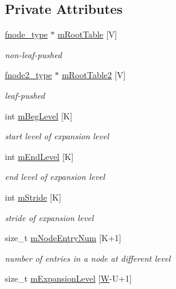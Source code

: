 \subsection*{Private Attributes}
\begin{DoxyCompactItemize}
\item 
\hyperlink{classRFSTree_a82d6848400f7c2700a6283cb34bca3eb}{fnode\-\_\-type} $\ast$ \hyperlink{classRFSTree_a808e44b5d80b37411742e657bd4ba526}{m\-Root\-Table} \mbox{[}V\mbox{]}
\begin{DoxyCompactList}\small\item\em non-\/leaf-\/pushed \end{DoxyCompactList}\item 
\hyperlink{classRFSTree_a0546714395e729135c856124425e97be}{fnode2\-\_\-type} $\ast$ \hyperlink{classRFSTree_a15a1ae729c49a0b6fa355ec4c7428f53}{m\-Root\-Table2} \mbox{[}V\mbox{]}
\begin{DoxyCompactList}\small\item\em leaf-\/pushed \end{DoxyCompactList}\item 
int \hyperlink{classRFSTree_a73a0204caef560c7075a52c5a9cd54aa}{m\-Beg\-Level} \mbox{[}K\mbox{]}
\begin{DoxyCompactList}\small\item\em start level of expansion level \end{DoxyCompactList}\item 
int \hyperlink{classRFSTree_ab54baf6241f9d89e388f1d06ca1a1122}{m\-End\-Level} \mbox{[}K\mbox{]}
\begin{DoxyCompactList}\small\item\em end level of expansion level \end{DoxyCompactList}\item 
int \hyperlink{classRFSTree_a381610989dd245063f297bd400adc841}{m\-Stride} \mbox{[}K\mbox{]}
\begin{DoxyCompactList}\small\item\em stride of expansion level \end{DoxyCompactList}\item 
size\-\_\-t \hyperlink{classRFSTree_a366b72f13bd85ba5e7a5405cdf8d59d6}{m\-Node\-Entry\-Num} \mbox{[}K+1\mbox{]}
\begin{DoxyCompactList}\small\item\em number of entries in a node at different level \end{DoxyCompactList}\item 
size\-\_\-t \hyperlink{classRFSTree_ac0537ae45e791bf13064ecff318ef051}{m\-Expansion\-Level} \mbox{[}\hyperlink{test__u128_8cpp_ab21b528bc38899d04d3a7053e52fb797}{W}-\/U+1\mbox{]}

\end{DoxyCompactItemize}
